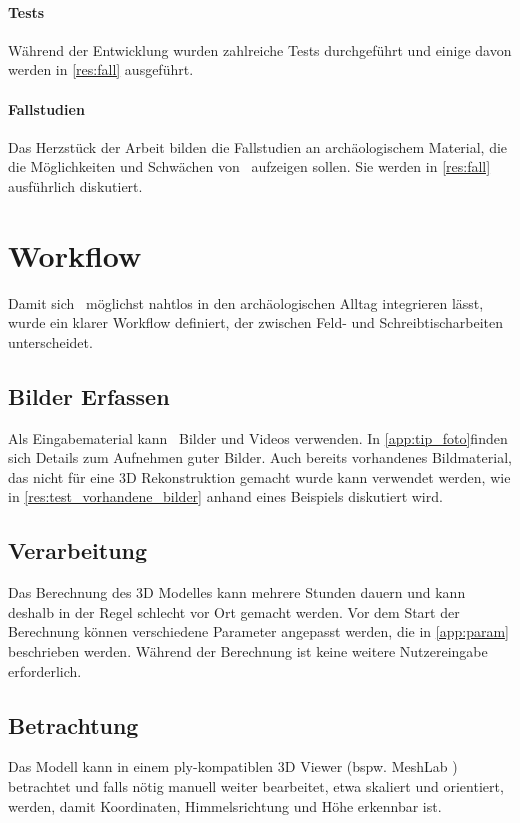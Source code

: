 		\paragraph{Tests}
		Während der Entwicklung wurden zahlreiche Tests durchgeführt und einige davon werden in \autoref{res:fall} ausgeführt.
		
		\paragraph{Fallstudien}
		Das Herzstück der Arbeit bilden die Fallstudien an archäologischem Material, die die Möglichkeiten und Schwächen von \dronarch\ aufzeigen sollen. Sie werden in \autoref{res:fall} ausführlich diskutiert.
		
	\section{Workflow}
		Damit sich \dronarch\ möglichst nahtlos in den archäologischen Alltag integrieren lässt, wurde ein klarer Workflow definiert, der zwischen Feld- und Schreibtischarbeiten unterscheidet.
		
		\subsection{Bilder Erfassen}
			Als Eingabematerial kann \dronarch\ Bilder und Videos verwenden. In \autoref{app:tip_foto}finden sich Details zum Aufnehmen guter Bilder.
			Auch bereits vorhandenes Bildmaterial, das nicht für eine 3D Rekonstruktion gemacht wurde kann  verwendet werden, wie in \autoref{res:test_vorhandene_bilder} anhand eines Beispiels diskutiert wird.
		
		\subsection{Verarbeitung}
			Das Berechnung des 3D Modelles kann mehrere Stunden dauern und kann deshalb in der Regel schlecht vor Ort gemacht werden. Vor dem Start der Berechnung können verschiedene Parameter angepasst werden, die in \autoref{app:param} beschrieben werden.
			Während der Berechnung ist keine weitere Nutzereingabe erforderlich.
		
		\subsection{Betrachtung}
			Das Modell kann in einem ply-kompatiblen 3D Viewer (bspw. MeshLab \cite{meshlab:home}) betrachtet und falls nötig manuell weiter bearbeitet, etwa skaliert und orientiert, werden, damit Koordinaten, Himmelsrichtung und Höhe erkennbar ist.

